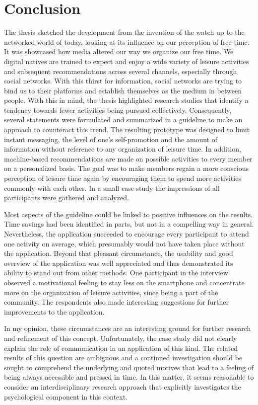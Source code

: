 \documentclass[12pt,numbers=noenddot,parskip,bibliography=totocnumbered,listof=totocnumbered,draft]{scrreprt}
\begin{document}
\chapter{Conclusion}
The thesis sketched the development from the invention of the watch up to the networked world of today, looking at its influence on our perception of free time. It was showcased how media altered our way we organize our free time. We digital natives are trained to expect and enjoy a wide variety of leisure activities and subsequent recommendations across several channels, especially through social networks. With this thirst for information, social networks are trying to bind us to their platforms and establish themselves as the medium in between people. With this in mind, the thesis highlighted research studies that identify a tendency towards fewer activities being pursued collectively. Consequently, several statements were formulated and summarized in a guideline to make an approach to counteract this trend. The resulting prototype was designed to limit instant messaging, the level of one's self-promotion and the amount of information without reference to any organization of leisure time. In addition, machine-based recommendations are made on possible activities to every member on a personalized basis. The goal was to make members regain a more conscious perception of leisure time again by encouraging them to spend more activities commonly with each other. In a small case study the impressions of all participants were gathered and analyzed.

Most aspects of the guideline could be linked to positive influences on the results. Time savings had been identified in parts, but not in a compelling way in general. Nevertheless, the application succeeded to encourage every participant to attend one activity on average, which presumably would not have taken place without the application. Beyond that pleasant circumstance, the usability and good overview of the application was well appreciated and thus demonstrated its ability to stand out from other methods. One participant in the interview observed a motivational feeling to stay less on the smartphone and concentrate more on the organization of leisure activities, since being a part of the community. The respondents also made interesting suggestions for further improvements to the application.

In my opinion, these circumstances are an interesting ground for further research and refinement of this concept. Unfortunately, the case study did not clearly explain the role of communication in an application of this kind. The related results of this question are ambiguous and a continued investigation should be sought to comprehend the underlying and quoted motives that lead to a feeling of being always accessible and pressed in time. In this matter, it seems reasonable to consider an interdisciplinary research approach that explicitly investigates the psychological component in this context.
\end{document}
